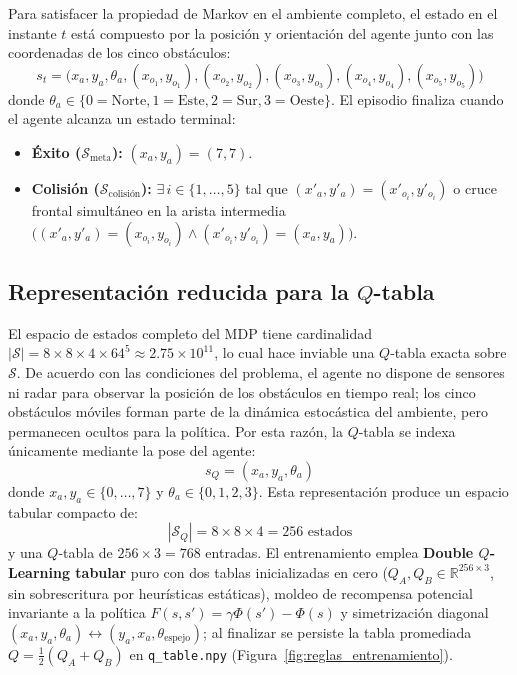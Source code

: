 \documentclass[11pt,a4paper]{article}
\begin{document}
Para satisfacer la propiedad de Markov en el ambiente completo, el estado en el instante \(t\) está compuesto por la posición y orientación del agente junto con las coordenadas de los cinco obstáculos:
\begin{equation}
    s_t = \big(x_a, y_a, \theta_a, (x_{o_1}, y_{o_1}), (x_{o_2}, y_{o_2}), (x_{o_3}, y_{o_3}), (x_{o_4}, y_{o_4}), (x_{o_5}, y_{o_5})\big)
\end{equation}
donde \(\theta_a \in \{0=\text{Norte}, 1=\text{Este}, 2=\text{Sur}, 3=\text{Oeste}\}\). El episodio finaliza cuando el agente alcanza un estado terminal:
\begin{itemize}[leftmargin=1.2cm]
    \item \textbf{Éxito (\(\mathcal{S}_{\text{meta}}\)):} \((x_a, y_a) = (7, 7)\).
    \item \textbf{Colisión (\(\mathcal{S}_{\text{colisión}}\)):} \(\exists\, i \in \{1,\dots,5\}\) tal que \((x'_a, y'_a) = (x'_{o_i}, y'_{o_i})\) o cruce frontal simultáneo en la arista intermedia \(\big((x'_a, y'_a) = (x_{o_i}, y_{o_i}) \land (x'_{o_i}, y'_{o_i}) = (x_a, y_a)\big)\).
\end{itemize}

\subsection{Representación reducida para la \(Q\)-tabla}
El espacio de estados completo del MDP tiene cardinalidad \(|\mathcal{S}| = 8 \times 8 \times 4 \times 64^5 \approx 2.75 \times 10^{11}\), lo cual hace inviable una \(Q\)-tabla exacta sobre \(\mathcal{S}\). De acuerdo con las condiciones del problema, el agente no dispone de sensores ni radar para observar la posición de los obstáculos en tiempo real; los cinco obstáculos móviles forman parte de la dinámica estocástica del ambiente, pero permanecen ocultos para la política.
Por esta razón, la \(Q\)-tabla se indexa únicamente mediante la pose del agente:
\begin{equation}
    s_{Q} = (x_a, y_a, \theta_a)
\end{equation}
donde \(x_a, y_a \in \{0,\dots,7\}\) y \(\theta_a \in \{0, 1, 2, 3\}\). Esta representación produce un espacio tabular compacto de:
\begin{equation}
    |\mathcal{S}_{Q}| = 8 \times 8 \times 4 = 256 \text{ estados}
\end{equation}
y una \(Q\)-tabla de \(256 \times 3 = 768\) entradas. El entrenamiento emplea \textbf{Double \(Q\)-Learning tabular} puro con dos tablas inicializadas en cero (\(Q_A, Q_B \in \mathbb{R}^{256 \times 3}\), sin sobrescritura por heurísticas estáticas), moldeo de recompensa potencial invariante a la política \(F(s,s') = \gamma \Phi(s') - \Phi(s)\) y simetrización diagonal \((x_a, y_a, \theta_a) \leftrightarrow (y_a, x_a, \theta_{\text{espejo}})\); al finalizar se persiste la tabla promediada \(Q = \frac{1}{2}(Q_A + Q_B)\) en \texttt{q\_table.npy} (Figura~\ref{fig:reglas_entrenamiento}).
\end{document}
